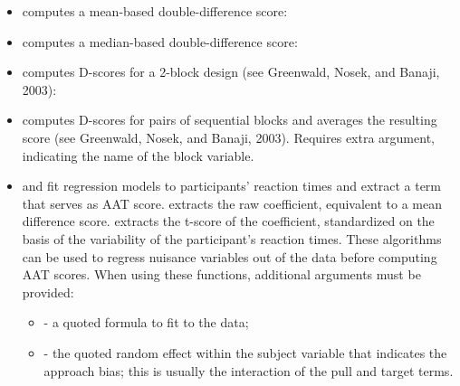 \documentclass[a4paper]{book}
\begin{document}
%
\begin{Description}\relax
\begin{itemize}

\item{}  computes a mean-based double-difference score:

\item{}  computes a median-based double-difference score:

\item{}  computes D-scores for a 2-block design (see Greenwald, Nosek, and Banaji, 2003):

\item{}  computes D-scores for pairs of sequential blocks
and averages the resulting score (see Greenwald, Nosek, and Banaji, 2003).
Requires extra  argument, indicating the name of the block variable.
\item{}  and  fit regression models to participants' reaction times and extract a term that serves as AAT score.
 extracts the raw coefficient, equivalent to a mean difference score.
 extracts the t-score of the coefficient, standardized on the basis of the variability of the participant's reaction times.
These algorithms can be used to regress nuisance variables out of the data before computing AAT scores.
When using these functions, additional arguments must be provided:
\begin{itemize}

\item{}  - a quoted formula to fit to the data;
\item{}  - the quoted random effect within the subject variable that indicates the approach bias; this is usually the interaction of the pull and target terms.


\end{itemize}
\end{itemize}
\end{Description}
\end{document}
